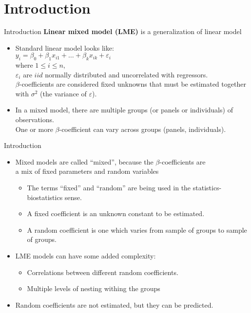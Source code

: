 \documentclass{beamer}
\begin{document}
\section{Introduction}
\begin{frame}{Introduction}
\textbf{Linear mixed model (LME)} is a generalization of linear model
\medskip
\begin{itemize}
\item Standard linear model looks like:\\
\medskip
$y_i = \beta_0 + \beta_1 x_{i1} + \dots + \beta_k x_{ik} + \varepsilon_i$\\
\medskip
where $ 1 \leq i \leq n$, \\$\varepsilon_i$ are $iid$ normally distributed and uncorrelated with regressors.\\ 
$\beta$-coefficients are considered fixed unknowns that must be
estimated together with $\sigma^2$ (the variance of $\varepsilon$).
\medskip
\item In a mixed model, there are multiple groups (or panels or
individuals) of observations. \\ \smallskip One or more $\beta$-coefficient can vary across groups (panels, individuals).
\end{itemize}
\end{frame}
\begin{frame}{Introduction}
\begin{itemize}
\item Mixed models are called ``mixed'', because the $\beta$-coefficients are \\a mix of fixed parameters and random variables
\smallskip 
\begin{itemize}
\item The terms ``fixed'' and ``random'' are being used in the statistics-biostatistics sense.
\item A fixed coefficient is an unknown constant to be estimated.
\item A random coefficient is one which varies from sample of groups to
sample of groups.
\end{itemize}
\smallskip
\item  LME models can have some added complexity:
\smallskip
\begin{itemize}
\item Correlations between different random coefficients.
\item Multiple levels of nesting withing the groups
\end{itemize}
\smallskip
\item Random  coefficients are not estimated, but they can be predicted.
\end{itemize}
\end{frame}
\end{document}
